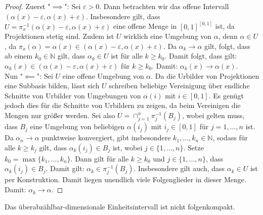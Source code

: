 \documentclass[11pt]{scrartcl}
\newcommand{\N}{\mathbb{N}}
\begin{document}
\begin{proof}
	Zuerst "$\implies$": Sei $\varepsilon >0$. Dann betrachten wir das offene Intervall $(\alpha(x)-\varepsilon, \alpha(x)+\varepsilon)$. Insbesondere gilt, 
	dass $U=\pi_{x}^{-1}(\alpha(x)-\varepsilon,\alpha(x)+\varepsilon)$ eine offene Menge in $[0,1]^{[0,1]}$ ist, da Projektionen stetig sind. Zudem ist $U$ wirklich eine Umgebung von $\alpha$, 
	denn $\alpha\in U$, da $\pi_x(\alpha)=\alpha(x)\in (\alpha(x)-\varepsilon,\alpha(x)+\varepsilon)$.
	Da $\alpha_k\rightarrow \alpha$ gilt, folgt, dass 
	ab einem $k_0\in\N$ gilt, dass $\alpha_k\in U$ ist für alle $k\geq k_0$. Damit folgt, dass gilt: $\alpha_k(x)\in (\alpha(x)-\varepsilon, \alpha(x)+\varepsilon)$ für $k \geq k_0$. 
	Damit: $\alpha_k(x)\rightarrow \alpha(x)$.\\
	Nun "$\impliedby$": Sei $U$ eine offene Umgebung von $\alpha$. Da die Urbilder von Projektionen eine Subbasis bilden, lässt sich $U$ schreiben beliebige Vereinigung über endliche Schnitte von Urbilder 
	von Umgebungen von $\alpha(i)$ mit $i\in [0,1]$. Es genügt jedoch dies für die Schnitte von Urbildern zu zeigen, da beim Vereinigen die Mengen nur größer werden. Sei also  $U=\cap_{j=1}^n 
	\pi_j^{-1}(B_j)$, wobei gelten muss, dass $B_j$ eine Umgebung von beliebigen $\alpha(i_j)$ mit $i_j\in [0,1]$ für $j=1,...,n$ ist. Da $\alpha_n\rightarrow \alpha$ punktweise konvergiert, gibt
	insbesondere $k_1,...,k_n\in\N$, sodass für alle $k \geq k_j$ gilt, dass $\alpha_k(i_j) \in B_j$ ist, wobei 
	$j\in \{1,...,n\}$. Setze $k_0=\max\{k_1,...,k_n\}$. Dann gilt für alle $k\geq k_0$ und $j \in \{1,...,n\}$, dass $\alpha_k(i_j) \in B_j$. Damit gilt: $\alpha_k\in \pi_j^{-1}(B_j)$. Insbesondere
	gilt auch, dass $\alpha_k \in U$ ist per Konstruktion. Damit liegen unendlich viele Folgenglieder in dieser Menge. Damit: $\alpha_k\rightarrow \alpha$.
\end{proof}
\begin{theorem}
	Das überabzählbar-dimensionale Einheitsintervall ist nicht folgenkompakt.
\end{theorem}
\end{document}
